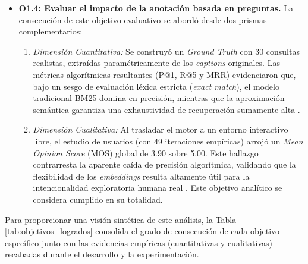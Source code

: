\documentclass[a4paper]{report}
\begin{document}
\begin{itemize}
    \item \textbf{O1.4: Evaluar el impacto de la anotación basada en preguntas.} La consecución de este objetivo evaluativo se abordó desde dos prismas complementarios:
    \begin{enumerate}
        \item[a)] \textit{Dimensión Cuantitativa:} Se construyó un \textit{Ground Truth} con 30 consultas realistas, extraídas paramétricamente de los \textit{captions} originales. Las métricas algorítmicas resultantes (P@1, R@5 y MRR) evidenciaron que, bajo un sesgo de evaluación léxica estricta (\textit{exact match}), el modelo tradicional BM25 domina en precisión, mientras que la aproximación semántica garantiza una exhaustividad de recuperación sumamente alta \cite{craswell2009mean}. 
        \item[b)] \textit{Dimensión Cualitativa:} Al trasladar el motor a un entorno interactivo libre, el estudio de usuarios (con 49 iteraciones empíricas) arrojó un \textit{Mean Opinion Score} (MOS) global de 3.90 sobre 5.00. Este hallazgo contrarresta la aparente caída de precisión algorítmica, validando que la flexibilidad de los \textit{embeddings} resulta altamente útil para la intencionalidad exploratoria humana real \cite{robertson2009bm25}. Este objetivo analítico se considera cumplido en su totalidad.
    \end{enumerate}
\end{itemize}

Para proporcionar una visión sintética de este análisis, la Tabla \ref{tab:objetivos_logrados} consolida el grado de consecución de cada objetivo específico junto con las evidencias empíricas (cuantitativas y cualitativas) recabadas durante el desarrollo y la experimentación.
\end{document}
